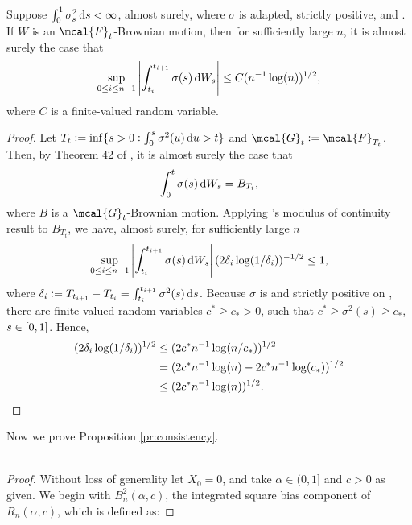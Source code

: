 \begin{appendices}
\begin{lem} \label{lem:mylevy}
  Suppose $\int^1_0\sigma^2_s \D s < \infty$, almost surely,   where $\sigma$ is adapted, strictly positive,  and \cadlag. If $W$ is an $\mcal{F}_t$-Brownian motion, then for sufficiently large $n$, it is almost surely the case that  
  \begin{align}
    \sup_{0 \le i \le n -1} \left \vert \int_{t_i}^{t_{i+1}} \sigma(s)  \D W_s   \right \vert \le C (n^{-1}  \log (n))^{1/2}, \notag
    \label{}
  \end{align}
  where $C$ is a finite-valued random variable.
\end{lem}
\begin{proof} Let $T_t := \inf\{s > 0: \int_0^s \sigma^2(u) \D u > t\}$ and  $\mcal{G}_t := \mcal{F}_{T_t}$. Then,  by Theorem 42 of \cite{Protter2004}, it is almost surely  the case that 
  \begin{align}
    \int_{0}^{t} \sigma(s)  \D W_s = B_{T_t},   \notag
    \label{}
  \end{align}
  where $B$ is a $\mcal{G}_t$-Brownian motion.
   Applying \levy's modulus of continuity result \citep[Theorem 10.32]{Rogers1994a} to $ B_{T_t} $, we have, almost surely,  for sufficiently large $n$
  \begin{align}
    \sup_{ 0 \le i \le n-1}\left\vert \int_{t_i}^{t_{i +  1}} \sigma(s)  \D W_s \right \vert  (2 \delta_i \log(1/\delta_i))^{-1/2} \le 1, 
    \label{}
  \end{align}
where $\delta_i := T_{t_{i+1}} - T_{t_i} = \int^{t_{i + 1}}_{t_i} \sigma^2(s) \D s$. Because $\sigma$ is \cadlag and strictly positive on \domain, there are finite-valued random variables $c^* \ge c_* > 0$, such that $c^* \ge \sigma^2(s) \ge c_*$, $s \in [0,1]$. Hence, 
  \begin{align}
    (2 \delta_i \log(1/\delta_i))^{1/2} & \le  (2 c^*n^{-1} \log(n/c_*))^{1/2}\notag\\
    &= (2 c^*n^{-1} \log(n) - 2 c^*n^{-1} \log(c_*)  )^{1/2}\notag\\
    &\le (2 c^*n^{-1} \log(n))^{1/2}\notag.
    \label{}
  \end{align}
\end{proof}
\noindent Now we prove Proposition \eqref{pr:consistency}.\\\\
\begin{proof}
Without loss of generality let $X_0 = 0$, and  take $\alpha  \in (0, 1]$ and $c > 0$ as given. We begin with $B^2_n(\alpha, c)$, the integrated square bias component of $R_n(\alpha,c)$, which is defined as:

\end{proof}
\end{appendices}
